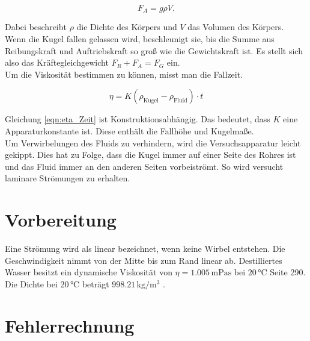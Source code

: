 \begin{equation*}
    F_A = g \rho V.
\end{equation*}

\noindent
Dabei beschreibt $\rho$ die Dichte des Körpers und $V$ das Volumen des Körpers.\\
\noindent
Wenn die Kugel fallen gelassen wird, beschleunigt sie, bis die Summe aus Reibungskraft und Auftriebskraft so groß wie die Gewichtskraft 
ist. Es stellt sich also das Kräftegleichgewicht $F_R + F_A = F_G$ ein.\\
\noindent
Um die Viskosität bestimmen zu können, misst man die Fallzeit.

\begin{equation}
    \eta = K(\rho_\text{Kugel} - \rho_\text{Fluid}) \cdot t
    \label{eqn:eta_Zeit}
\end{equation}

\noindent
Gleichung \eqref{eqn:eta_Zeit} ist Konstruktionsabhängig. Das bedeutet, dass $K$ eine Apparaturkonstante ist. Diese enthält die Fallhöhe 
und Kugelmaße.\\

\noindent
Um Verwirbelungen des Fluids zu verhindern, wird die Versuchsapparatur leicht gekippt. Dies hat zu Folge, dass die Kugel immer auf einer 
Seite des Rohres ist und das Fluid immer an den anderen Seiten vorbeiströmt. So wird versucht laminare Strömungen zu erhalten.

\section{Vorbereitung}
Eine Strömung wird als linear bezeichnet, wenn keine Wirbel entstehen. Die Geschwindigkeit nimmt von der Mitte bis zum Rand linear ab.
Destilliertes Wasser besitzt ein dynamische Viskosität von $\eta = 1.005\, \unit{\milli \pascal \second}$ bei $20\, \unit{\celsius}$ 
\cite{Physikalisches_Praktikum} Seite 290. Die Dichte bei $20\, \unit{\celsius}$ beträgt $998.21\, \unit{\kilo \gram \per \cubic \meter}$
\cite{Physikalisches_Praktikum}.

\section{Fehlerrechnung}
